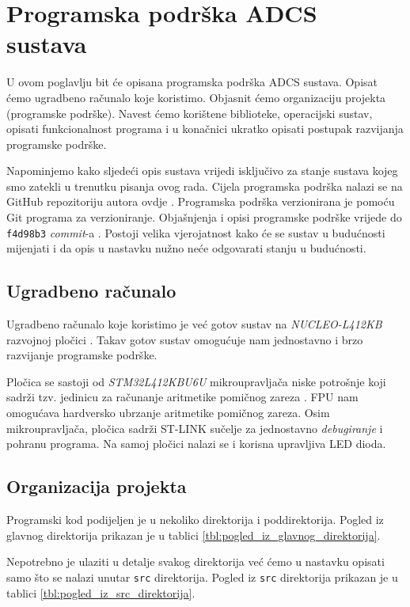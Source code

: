 \documentclass[times, utf8, diplomski, numeric]{templates/template}
\begin{document}
\chapter{Programska podrška ADCS sustava}{
    U ovom poglavlju bit će opisana programska podrška ADCS sustava. Opisat ćemo ugradbeno računalo koje koristimo. Objasnit ćemo organizaciju projekta (programske podrške). Navest ćemo korištene biblioteke, operacijski sustav, opisati funkcionalnost programa i u konačnici ukratko opisati postupak razvijanja programske podrške.

    Napominjemo kako sljedeći opis sustava vrijedi isključivo za stanje sustava kojeg smo zatekli u trenutku pisanja ovog rada. Cijela programska podrška nalazi se na GitHub repozitoriju autora ovdje \cite{github_repo}. Programska podrška verzionirana je pomoću Git \cite{git} programa za verzioniranje. Objašnjenja i opisi programske podrške vrijede do \texttt{f4d98b3} \emph{commit}-a \cite{git_commit}. Postoji velika vjerojatnost kako će se sustav u budućnosti mijenjati i da opis u nastavku nužno neće odgovarati stanju u budućnosti. 

    \section{Ugradbeno računalo}{
        Ugradbeno računalo koje koristimo je već gotov sustav na \emph{NUCLEO-L412KB} razvojnoj pločici \cite{nucleo_um}. Takav gotov sustav omogućuje nam jednostavno i brzo razvijanje programske podrške. 

        Pločica se sastoji od \emph{STM32L412KBU6U} mikroupravljača niske potrošnje \cite{uc_um} koji sadrži tzv. jedinicu za računanje aritmetike pomičnog zareza . FPU nam omogućava hardversko ubrzanje aritmetike pomičnog zareza. Osim mikroupravljača, pločica sadrži ST-LINK sučelje za jednostavno \emph{debugiranje} i pohranu programa. Na samoj pločici nalazi se i korisna upravljiva LED dioda.
    }

    \section{Organizacija projekta}{
        Programski kod podijeljen je u nekoliko direktorija i poddirektorija. Pogled iz glavnog direktorija prikazan je u tablici \ref{tbl:pogled_iz_glavnog_direktorija}.

        Nepotrebno je ulaziti u detalje svakog direktorija već ćemo u nastavku opisati samo što se nalazi unutar \texttt{src} direktorija. Pogled iz \texttt{src} direktorija prikazan je u tablici \ref{tbl:pogled_iz_src_direktorija}.

}}
\end{document}

